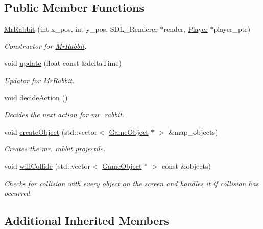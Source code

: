 \subsection*{Public Member Functions}
\begin{DoxyCompactItemize}
\item 
\hyperlink{class_mr_rabbit_a9b8c7154199faef4d81134cf231bd53d}{Mr\+Rabbit} (int x\+\_\+pos, int y\+\_\+pos, S\+D\+L\+\_\+\+Renderer $\ast$render, \hyperlink{class_player}{Player} $\ast$player\+\_\+ptr)
\begin{DoxyCompactList}\small\item\em Constructor for \hyperlink{class_mr_rabbit}{Mr\+Rabbit}. \end{DoxyCompactList}\item 
void \hyperlink{class_mr_rabbit_ac5a5229bd3b1b8be9b7edd0f86fa754d}{update} (float const \&delta\+Time)
\begin{DoxyCompactList}\small\item\em Updator for \hyperlink{class_mr_rabbit}{Mr\+Rabbit}. \end{DoxyCompactList}\item 
void \hyperlink{class_mr_rabbit_a68b8b4781ddb1a449b52425a11d035bf}{decide\+Action} ()
\begin{DoxyCompactList}\small\item\em Decides the next action for mr. rabbit. \end{DoxyCompactList}\item 
void \hyperlink{class_mr_rabbit_a117b3bd7ec5019a5bdaf3de39f473397}{create\+Object} (std\+::vector$<$ \hyperlink{class_game_object}{Game\+Object} $\ast$ $>$ \&map\+\_\+objects)
\begin{DoxyCompactList}\small\item\em Creates the mr. rabbit projectile. \end{DoxyCompactList}\item 
void \hyperlink{class_mr_rabbit_a18dbce185702a664bd85e4c4689df415}{will\+Collide} (std\+::vector$<$ \hyperlink{class_game_object}{Game\+Object} $\ast$ $>$ const \&objects)
\begin{DoxyCompactList}\small\item\em Checks for collision with every object on the screen and handles it if collision has occurred. \end{DoxyCompactList}\end{DoxyCompactItemize}
\subsection*{Additional Inherited Members}


